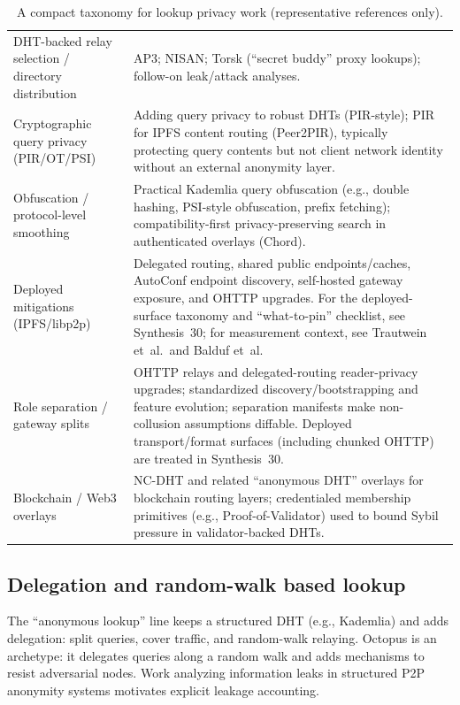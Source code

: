 \documentclass[11pt]{article}
\begin{document}
\begin{table}[t]
\begin{tabularx}{\linewidth}{@{}lX@{}}
DHT-backed relay selection / directory distribution & AP3; NISAN; Torsk (``secret buddy'' proxy lookups); follow-on leak/attack analyses.\cite{ap3,nisan,torsk,wangborisovLookupCCS2010,mittal_tissec} \\
Cryptographic query privacy (PIR/OT/PSI) & Adding query privacy to robust DHTs (PIR-style); PIR for IPFS content routing (Peer2PIR), typically protecting query contents but not client network identity without an external anonymity layer.\cite{backesQueryPrivacy2012,peer2pir2024} \\
Obfuscation / protocol-level smoothing & Practical Kademlia query obfuscation (e.g., double hashing, PSI-style obfuscation, prefix fetching); compatibility-first privacy-preserving search in authenticated overlays (Chord).\cite{danielQueryObfuscationSAC2025,irisNDSS2025} \\
Deployed mitigations (IPFS/libp2p) & Delegated routing, shared public endpoints/caches, AutoConf endpoint discovery, self-hosted gateway exposure, and OHTTP upgrades. For the deployed-surface taxonomy and ``what-to-pin'' checklist, see Synthesis~30; for measurement context, see Trautwein et~al.\ and Balduf et~al.\cite{series:deployedsurfaces,trautweinIPFS2022,balduf_cloud_strikes_back} \\
Role separation / gateway splits & OHTTP relays and delegated-routing reader-privacy upgrades; standardized discovery/bootstrapping and feature evolution; separation manifests make non-collusion assumptions diffable. Deployed transport/format surfaces (including chunked OHTTP) are treated in Synthesis~30.\cite{rfc9458OHTTP,rfc9540OHTTPDiscovery,series:primarysepmanifest,series:deployedsurfaces} \\
Blockchain / Web3 overlays & NC-DHT and related ``anonymous DHT'' overlays for blockchain routing layers; credentialed membership primitives (e.g., Proof-of-Validator) used to bound Sybil pressure in validator-backed DHTs. \cite{tsengNCDHT2024,proofOfValidator2023} \\
\bottomrule
\end{tabularx}
\caption{A compact taxonomy for lookup privacy work (representative references only).}
\label{tab:tax}
\end{table}


\subsection{Delegation and random-walk based lookup}
The ``anonymous lookup'' line keeps a structured DHT (e.g., Kademlia\cite{kademlia}) and adds delegation: split queries, cover traffic, and random-walk relaying.
Octopus is an archetype: it delegates queries along a random walk and adds mechanisms to resist adversarial nodes.\cite{octopus,wangborisovLookupCCS2010}
Work analyzing information leaks in structured P2P anonymity systems motivates explicit leakage accounting.\cite{mittal_tissec}
\end{document}
